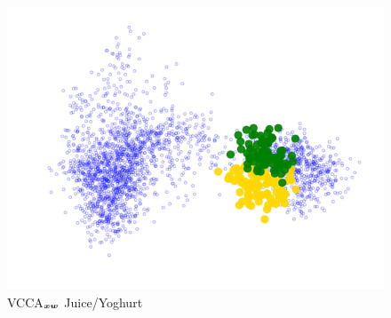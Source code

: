 \begin{subfigure}[b]{0.3\textwidth}
	\centering
	\includegraphics[width=\textwidth]{Chapter1/pics_paperB/pca_latents_juice_yoghurt_vcca_xw_seed2}
	\caption{VCCA$_{{\bm{x}}{\bm{w}}}$ Juice/Yoghurt}
	\label{fig:pca_latents_vcca_xw_juice_yoghurt}
\end{subfigure}